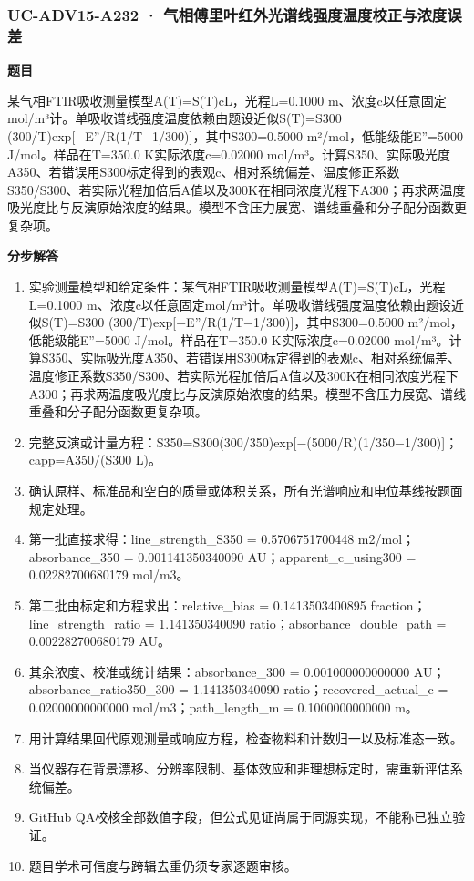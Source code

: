 \documentclass[UTF8,11pt,a4paper]{ctexart}
\begin{document}
\subsubsection*{UC-ADV15-A232 · 气相傅里叶红外光谱线强度温度校正与浓度误差}
\noindent\textbf{题目}\par
某气相FTIR吸收测量模型A(T)=S(T)cL，光程L=0.1000 m、浓度c以任意固定mol/m³计。单吸收谱线强度温度依赖由题设近似S(T)=S300 (300/T)exp[−E''/R(1/T−1/300)]，其中S300=0.5000 m²/mol，低能级能E''=5000 J/mol。样品在T=350.0 K实际浓度c=0.02000 mol/m³。计算S350、实际吸光度A350、若错误用S300标定得到的表观c、相对系统偏差、温度修正系数S350/S300、若实际光程加倍后A值以及300K在相同浓度光程下A300；再求两温度吸光度比与反演原始浓度的结果。模型不含压力展宽、谱线重叠和分子配分函数更复杂项。\par
\medskip\noindent\textbf{分步解答}
\begin{enumerate}
\item 实验测量模型和给定条件：某气相FTIR吸收测量模型A(T)=S(T)cL，光程L=0.1000 m、浓度c以任意固定mol/m³计。单吸收谱线强度温度依赖由题设近似S(T)=S300 (300/T)exp[−E''/R(1/T−1/300)]，其中S300=0.5000 m²/mol，低能级能E''=5000 J/mol。样品在T=350.0 K实际浓度c=0.02000 mol/m³。计算S350、实际吸光度A350、若错误用S300标定得到的表观c、相对系统偏差、温度修正系数S350/S300、若实际光程加倍后A值以及300K在相同浓度光程下A300；再求两温度吸光度比与反演原始浓度的结果。模型不含压力展宽、谱线重叠和分子配分函数更复杂项。
\item 完整反演或计量方程：S350=S300(300/350)exp[−(5000/R)(1/350−1/300)]；capp=A350/(S300 L)。
\item 确认原样、标准品和空白的质量或体积关系，所有光谱响应和电位基线按题面规定处理。
\item 第一批直接求得：line\_strength\_S350 = 0.5706751700448 m2/mol；absorbance\_350 = 0.001141350340090 AU；apparent\_c\_using300 = 0.02282700680179 mol/m3。
\item 第二批由标定和方程求出：relative\_bias = 0.1413503400895 fraction；line\_strength\_ratio = 1.141350340090 ratio；absorbance\_double\_path = 0.002282700680179 AU。
\item 其余浓度、校准或统计结果：absorbance\_300 = 0.001000000000000 AU；absorbance\_ratio350\_300 = 1.141350340090 ratio；recovered\_actual\_c = 0.02000000000000 mol/m3；path\_length\_m = 0.1000000000000 m。
\item 用计算结果回代原观测量或响应方程，检查物料和计数归一以及标准态一致。
\item 当仪器存在背景漂移、分辨率限制、基体效应和非理想标定时，需重新评估系统偏差。
\item GitHub QA校核全部数值字段，但公式见证尚属于同源实现，不能称已独立验证。
\item 题目学术可信度与跨辑去重仍须专家逐题审核。
\end{enumerate}
\end{document}
